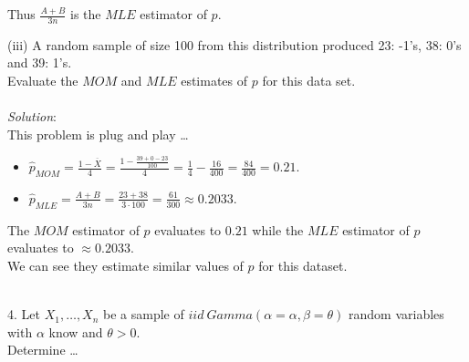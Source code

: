 \documentclass[12pt]{article}
\newcommand{\XB}{\color{black}}
\newcommand{\XBB}{\color{blue}}
\newcommand{\ds}{\displaystyle}
\begin{document}
\noindent
Thus $ \ds \frac{A + B}{3n} $ is the $ MLE $ estimator of $ p $. \\

\vspace{2.5mm}

(iii) A random sample of size 100 from this distribution produced 23: -1’s, 38: 0’s and 39: 1’s. \\
Evaluate the $ MOM $ and $ MLE $ estimates of $ p $ for this data set. \\
\vspace{2.5mm} \\
\textit{Solution}:
\vspace{2.5mm} \\

\noindent
This problem is plug and play \dots \\

\begin{itemize}
    \item $ \ds \hat{p}_{MOM} = \frac{1 - \overline{X}}{4} = \frac{1 - \frac{39 + 0 -23}{100}}{4} = \frac{1}{4} - \frac{16}{400} = \frac{84}{400} = 0.21 $.
    \item $ \ds \hat{p}_{MLE} = \frac{A + B}{3n} = \frac{23 + 38}{3 \cdot 100} = \frac{61}{300} \approx 0.2033 $.
\end{itemize}

\noindent
The $ MOM $ estimator of $ p $ evaluates to $ 0.21 $ while the $ MLE $ estimator of $ p $ evaluates to $ \approx 0.2033 $. \\

We can see they estimate similar values of $ p $ for this dataset. \\

\vspace{2.5mm}

\newpage
\XBB\hrulefill\XB \\

4. Let $ X_{1}, \dots , X_{n} $ be a sample of $ iid \ Gamma(\alpha = \alpha, \beta = \theta) $ random variables
with $ \alpha $ know and $ \theta > 0 $. \\

Determine \dots \\
\end{document}
